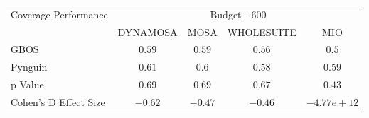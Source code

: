 \begin{tabular}{lcccc}\toprule 
\multirow{2}{*}{Coverage Performance} & \multicolumn{4}{c}{Budget - 600} \\ \cmidrule(lr){2-5}  
                                      & DYNAMOSA&MOSA&WHOLESUITE&MIO                         \\ \midrule 
GBOS                                  & \(0.59\)&\(0.59\)&\(0.56\)&\(0.5\)                       \\ 
Pynguin                               & \(0.61\)&\(0.6\)&\(0.58\)&\(0.59\)                       \\ 
p Value                               & \(0.69\)&\(0.69\)&\(0.67\)&\(0.43\)                     \\ 
Cohen's D Effect Size                 & \(-0.62\)&\(-0.47\)&\(-0.46\)&\(-4.77e+12\)                       \\ 
\bottomrule 
\end{tabular}